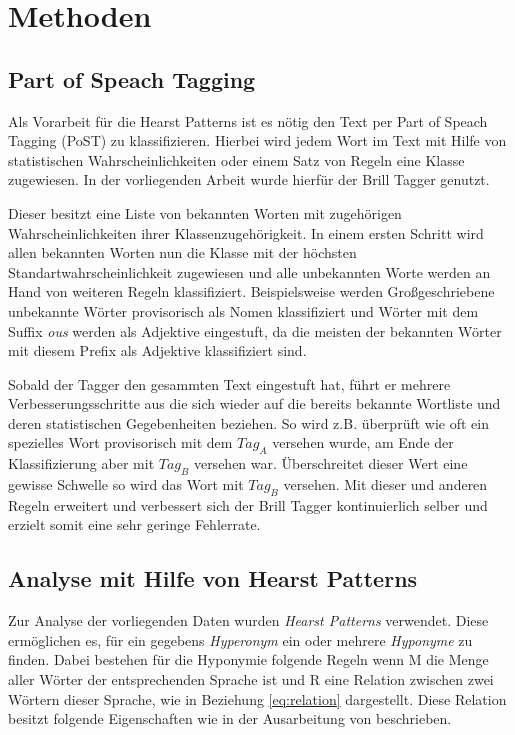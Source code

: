 \section{Methoden}
\subsection{Part of Speach Tagging}
Als Vorarbeit für die Hearst Patterns ist es nötig den Text per Part of Speach Tagging (PoST) zu klassifizieren.
Hierbei wird jedem Wort im Text mit Hilfe von statistischen Wahrscheinlichkeiten oder einem Satz von Regeln eine Klasse zugewiesen.
In der vorliegenden Arbeit wurde hierfür der Brill Tagger genutzt. 

Dieser besitzt eine Liste von bekannten Worten mit zugehörigen
Wahrscheinlichkeiten ihrer Klassenzugehörigkeit. In einem ersten Schritt wird allen bekannten Worten nun die Klasse mit der höchsten
Standartwahrscheinlichkeit zugewiesen und alle unbekannten Worte werden an Hand von weiteren Regeln klassifiziert. Beispielsweise werden Großgeschriebene 
unbekannte Wörter provisorisch als Nomen klassifiziert und Wörter mit dem Suffix \textit{ous} werden als Adjektive eingestuft,
da die meisten der bekannten Wörter mit diesem Prefix als Adjektive klassifiziert sind. 

Sobald der Tagger den gesammten Text eingestuft hat, führt er
mehrere Verbesserungsschritte aus die sich wieder auf die bereits bekannte Wortliste und deren statistischen Gegebenheiten beziehen. So wird z.B. 
überprüft wie oft ein spezielles Wort provisorisch mit dem $Tag_{A}$ versehen wurde, am Ende der Klassifizierung aber mit $Tag_{B}$ versehen war. 
Überschreitet dieser Wert eine gewisse Schwelle so wird das Wort mit $Tag_{B}$ versehen. Mit dieser und anderen Regeln erweitert und verbessert sich der
Brill Tagger kontinuierlich selber und erzielt somit eine sehr geringe Fehlerrate. \cite{bib:Brill1992}

\subsection{Analyse mit Hilfe von Hearst Patterns}

Zur Analyse der vorliegenden Daten wurden \textit{Hearst Patterns} verwendet. 
Diese ermöglichen es, für ein gegebens \textit{Hyperonym} ein oder mehrere \textit{Hyponyme} zu finden. 
Dabei bestehen für die Hyponymie folgende Regeln wenn M die Menge aller Wörter der 
entsprechenden Sprache ist und R eine Relation zwischen zwei Wörtern dieser Sprache, wie in Beziehung \ref{eq:relation} dargestellt.
Diese Relation besitzt folgende Eigenschaften wie in der Ausarbeitung von  beschrieben.

